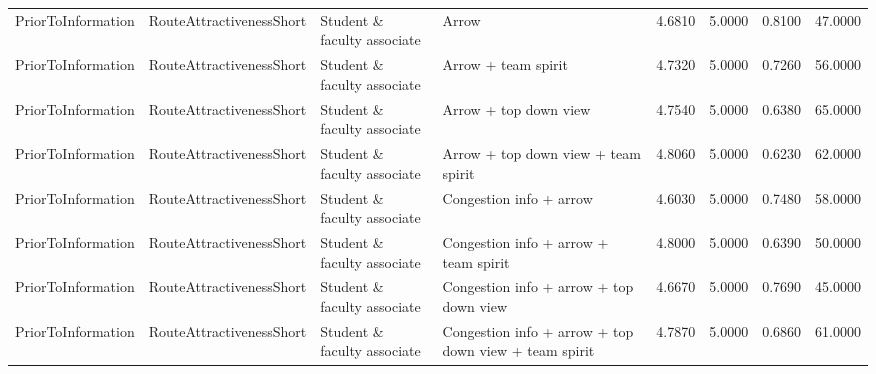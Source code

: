 \begin{tabular}{llllrrrr}
  PriorToInformation & RouteAttractivenessShort & Student \& faculty associate & Arrow & 4.6810 & 5.0000 & 0.8100 & 47.0000 \\ 
  PriorToInformation & RouteAttractivenessShort & Student \& faculty associate & Arrow + team spirit & 4.7320 & 5.0000 & 0.7260 & 56.0000 \\ 
  PriorToInformation & RouteAttractivenessShort & Student \& faculty associate & Arrow + top down view & 4.7540 & 5.0000 & 0.6380 & 65.0000 \\ 
  PriorToInformation & RouteAttractivenessShort & Student \& faculty associate & Arrow + top down view + team spirit & 4.8060 & 5.0000 & 0.6230 & 62.0000 \\ 
  PriorToInformation & RouteAttractivenessShort & Student \& faculty associate & Congestion info + arrow & 4.6030 & 5.0000 & 0.7480 & 58.0000 \\ 
  PriorToInformation & RouteAttractivenessShort & Student \& faculty associate & Congestion info + arrow + team spirit & 4.8000 & 5.0000 & 0.6390 & 50.0000 \\ 
  PriorToInformation & RouteAttractivenessShort & Student \& faculty associate & Congestion info + arrow + top down view & 4.6670 & 5.0000 & 0.7690 & 45.0000 \\ 
  PriorToInformation & RouteAttractivenessShort & Student \& faculty associate & Congestion info + arrow + top down view + team spirit & 4.7870 & 5.0000 & 0.6860 & 61.0000 \\ 
   \hline
\end{tabular}

